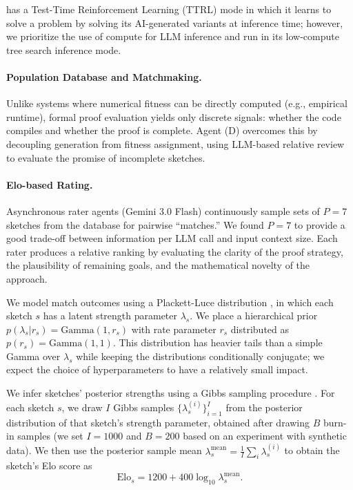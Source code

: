 {\AP} has a Test-Time Reinforcement Learning (TTRL) mode in which it learns to solve a problem by solving its AI-generated variants at inference time; however, we prioritize the use of compute for LLM inference and run {\AP} in its low-compute tree search inference mode.

\paragraph{Population Database and Matchmaking.} Unlike systems where numerical fitness can be directly computed (e.g., empirical runtime), formal proof evaluation yields only discrete signals: whether the code compiles and whether the proof is complete. Agent (D) overcomes this by decoupling generation from fitness assignment, using LLM-based relative review to evaluate the promise of incomplete sketches.

\paragraph{Elo-based Rating.} Asynchronous rater agents (Gemini 3.0 Flash) continuously sample sets of $P = 7$ sketches from the database for pairwise ``matches.'' We found $P=7$ to provide a good trade-off between information per LLM call and input context size. Each rater produces a relative ranking by evaluating the clarity of the proof strategy, the plausibility of remaining goals, and the mathematical novelty of the approach.

We model match outcomes using a Plackett-Luce distribution \cite{plackett1975analysis,luce1959individual}, in which each sketch $s$ has a latent strength parameter $\lambda_s$. We place a hierarchical prior $p(\lambda_s | r_s) = \textrm{Gamma}(1, r_s)$ with rate parameter $r_s$ distributed as $p(r_s) = \textrm{Gamma}(1,1)$. This distribution has heavier tails than a simple Gamma over $\lambda_s$ while keeping the distributions conditionally conjugate; we expect the choice of hyperparameters to have a relatively small impact. 

We infer sketches' posterior strengths using a Gibbs sampling procedure \cite{caron2012efficient}. For each sketch $s$, we draw $I$ Gibbs samples $\{\lambda_s^{(i)}\}_{i=1}^{I}$ from the posterior distribution of that sketch's strength parameter, obtained after drawing $B$ burn-in samples (we set $I=1000$ and $B=200$ based on an experiment with synthetic data). We then use the posterior sample mean $\lambda_s^{\textrm{mean}} = \frac{1}{I} \sum_i \lambda_s^{(i)}$ to obtain the sketch's Elo score as
\[
    \textrm{Elo}_s = 1200 + 400 \log_{10} \lambda_s^{\textrm{mean}}.
\]

